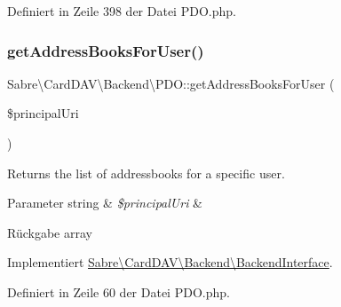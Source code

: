 Definiert in Zeile 398 der Datei P\+D\+O.\+php.

\mbox{\label{class_sabre_1_1_card_d_a_v_1_1_backend_1_1_p_d_o_ab7e926f24a4120ec0acc3b5315c555be}} 
\subsubsection{\texorpdfstring{get\+Address\+Books\+For\+User()}{getAddressBooksForUser()}}
{\footnotesize\ttfamily Sabre\textbackslash{}\+Card\+D\+A\+V\textbackslash{}\+Backend\textbackslash{}\+P\+D\+O\+::get\+Address\+Books\+For\+User (\begin{DoxyParamCaption}\item[{}]{\$principal\+Uri }\end{DoxyParamCaption})}

Returns the list of addressbooks for a specific user.


\begin{DoxyParams}[1]{Parameter}
string & {\em \$principal\+Uri} & \\
\hline
\end{DoxyParams}
\begin{DoxyReturn}{Rückgabe}
array 
\end{DoxyReturn}


Implementiert \mbox{\hyperlink{interface_sabre_1_1_card_d_a_v_1_1_backend_1_1_backend_interface_a47302ae5f71c46e7e729f20fb4be65ec}{Sabre\textbackslash{}\+Card\+D\+A\+V\textbackslash{}\+Backend\textbackslash{}\+Backend\+Interface}}.



Definiert in Zeile 60 der Datei P\+D\+O.\+php.

\mbox{\label{class_sabre_1_1_card_d_a_v_1_1_backend_1_1_p_d_o_a8ce1c064d4f5842c62cab2320033135e}} 
